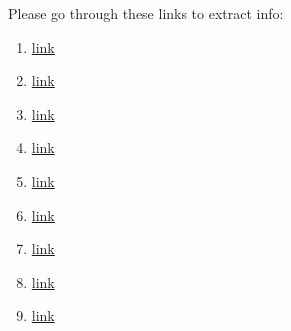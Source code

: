 \documentclass[10pt, openany]{book}
\begin{document}
\tableofcontents

% 

% 

\newpage


% 

Please go through these links to extract info:
\begin{enumerate}
    \item \href{https://www.youtube.com/watch?v=WujIkCgawFI&list=PLmK1EnKxphinxBub5hL0ZoJXWoqjkGE19&index=11}{link}
    \item \href{https://www.youtube.com/watch?v=jgh0TNfx0gQ}{link}
    \item \href{https://laurenselectric.com/commercial-services/understanding-power-factor/}{link}
    \item \href{https://www.eeeguide.com/substations-interview-questions-and-answers/}{link}
    \item \href{https://circuitglobe.com/types-of-faults-in-power-system.html}{link}
    \item \href{https://peguru.com/2019/08/voltage-transformer/}{link}
    \item \href{https://www.pes-psrc.org/kb/report/047.pdf}{link}
    \item \href{https://electrical-engineering-portal.com/download-center/books-and-guides/relays}{link}
    \item \href{https://eepower.com/technical-articles/calculating-the-turns-ratio-of-a-transformer/}{link}

\end{enumerate}
\end{document}
